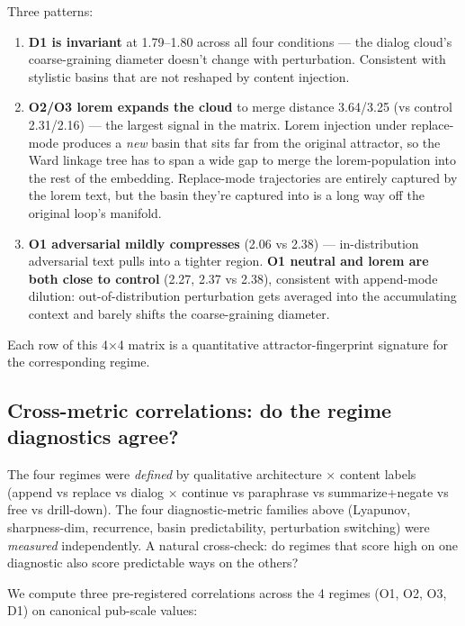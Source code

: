 \documentclass{article}
\theoremstyle{plain}
\theoremstyle{definition}
\begin{document}
Three patterns:

\begin{enumerate}
  \item \textbf{D1 is invariant} at 1.79–1.80 across all four conditions — the
   dialog cloud's coarse-graining diameter doesn't change with
   perturbation. Consistent with stylistic basins that are not
   reshaped by content injection.
  \item \textbf{O2/O3 lorem expands the cloud} to merge distance 3.64/3.25
   (vs control 2.31/2.16) — the largest signal in the matrix.
   Lorem injection under replace-mode produces a \textit{new} basin that sits
   far from the original attractor, so the Ward linkage tree has to
   span a wide gap to merge the lorem-population into the rest of the
   embedding. Replace-mode trajectories are entirely captured by the
   lorem text, but the basin they're captured into is a long way
   off the original loop's manifold.
  \item \textbf{O1 adversarial mildly compresses} (2.06 vs 2.38) — in-distribution
   adversarial text pulls into a tighter region. \textbf{O1 neutral and
   lorem are both close to control} (2.27, 2.37 vs 2.38), consistent
   with append-mode dilution: out-of-distribution perturbation gets
   averaged into the accumulating context and barely shifts the
   coarse-graining diameter.
\end{enumerate}

Each row of this 4×4 matrix is a quantitative attractor-fingerprint
signature for the corresponding regime.

\subsection{Cross-metric correlations: do the regime diagnostics agree?}

The four regimes were \textit{defined} by qualitative architecture × content
labels (append vs replace vs dialog × continue vs paraphrase vs
summarize+negate vs free vs drill-down). The four diagnostic-metric
families above (Lyapunov, sharpness-dim, recurrence, basin
predictability, perturbation switching) were \textit{measured} independently.
A natural cross-check: do regimes that score high on one diagnostic
also score predictable ways on the others?

We compute three pre-registered correlations across the 4 regimes
(O1, O2, O3, D1) on canonical pub-scale values:
\end{document}
